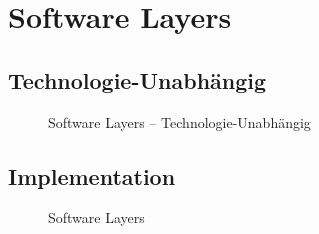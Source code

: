 \section{Software Layers}

\subsection*{Technologie-Unabhängig}

\begin{figure}[ht!]
	\centering{
		
	}

	\caption{Software Layers -- Technologie-Unabhängig}
\end{figure}

\newpage
\subsection*{Implementation}

\begin{figure}[ht!]
	\centering{
		
	}

	\caption{Software Layers}
\end{figure}